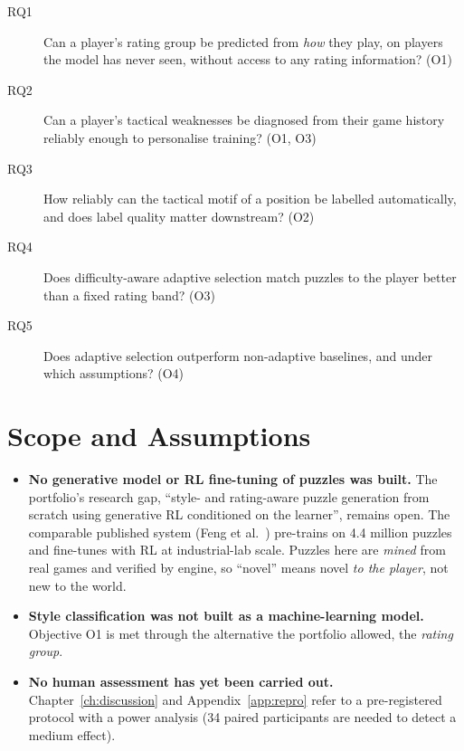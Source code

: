 \begin{description}
  \item[RQ1] Can a player's rating group be predicted from \emph{how} they play, on players the model
        has never seen, without access to any rating information? (O1)
  \item[RQ2] Can a player's tactical weaknesses be diagnosed from their game history reliably
        enough to personalise training? (O1, O3)
  \item[RQ3] How reliably can the tactical motif of a position be labelled automatically, and does
        label quality matter downstream? (O2)
  \item[RQ4] Does difficulty-aware adaptive selection match puzzles to the player better than a
        fixed rating band? (O3)
  \item[RQ5] Does adaptive selection outperform non-adaptive baselines, and under which
        assumptions? (O4)
\end{description}

\section{Scope and Assumptions}\label{sec:scope}

\begin{honest}
\begin{itemize}
  \item \textbf{No generative model or RL fine-tuning of puzzles was built.} The portfolio's
        research gap, ``style- and rating-aware puzzle generation from scratch using generative RL
        conditioned on the learner'', remains open. The comparable published system (Feng et
        al.~\cite{feng2025generating}) pre-trains on 4.4 million puzzles and fine-tunes with RL at
        industrial-lab scale. Puzzles here are \emph{mined} from real games and verified by engine,
        so ``novel'' means novel \emph{to the player}, not new to the world.
  \item \textbf{Style classification was not built as a machine-learning model.} Objective O1 is met
        through the alternative the portfolio allowed, the \emph{rating group}.
  \item \textbf{No human assessment has yet been carried out.} Chapter~\ref{ch:discussion} and
        Appendix~\ref{app:repro} refer to a pre-registered protocol with a power analysis (34 paired
        participants are needed to detect a medium effect).
\end{itemize}
\end{honest}

